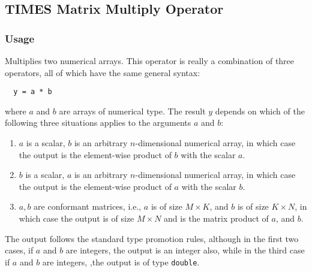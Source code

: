 %
%
%
\subsection{TIMES Matrix Multiply Operator}
\subsubsection{Usage}
Multiplies two numerical arrays.  This operator is really a combination
of three operators, all of which have the same general syntax:
\begin{verbatim}
  y = a * b
\end{verbatim}
where $a$ and $b$ are arrays of numerical type.  The result $y$ depends
on which of the following three situations applies to the arguments
$a$ and $b$:
\begin{enumerate}
  \item $a$ is a scalar, $b$ is an arbitrary $n$-dimensional numerical array, in which case the output is the element-wise product of $b$ with the scalar $a$.
  \item $b$ is a scalar, $a$ is an arbitrary $n$-dimensional numerical array, in which case the output is the element-wise product of $a$ with the scalar $b$.
  \item $a,b$ are conformant matrices, i.e., $a$ is of size $M \times K$, and $b$ is of size $K \times N$, in which case the output is of size $M \times N$ and is the matrix product of $a$, and $b$.
\end{enumerate}
The output follows the standard type promotion rules, although in the first two cases, if $a$ and $b$ are integers, the output is an integer also, while in the third case if $a$ and $b$ are integers, ,the output is of type \verb|double|.
